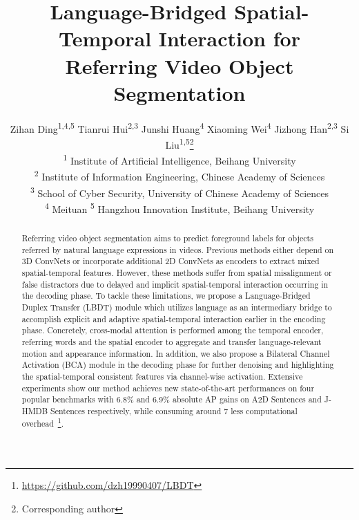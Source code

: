 \documentclass[10pt,twocolumn,letterpaper]{article}
\begin{document}
\title{Language-Bridged Spatial-Temporal Interaction for \\Referring Video Object Segmentation}

\author{Zihan Ding\textsuperscript{\rm 1,4,5} \quad Tianrui Hui\textsuperscript{\rm 2,3} \quad Junshi Huang\textsuperscript{\rm 4} \quad Xiaoming Wei\textsuperscript{\rm 4} \quad Jizhong Han\textsuperscript{\rm 2,3} \quad Si Liu\textsuperscript{\rm 1,5}\thanks{Corresponding author} \\
\textsuperscript{\rm 1} Institute of Artificial Intelligence, Beihang University\\
\textsuperscript{\rm 2} Institute of Information Engineering, Chinese Academy of Sciences\\
\textsuperscript{\rm 3} School of Cyber Security, University of Chinese Academy of Sciences\\
\textsuperscript{\rm 4} Meituan \quad \textsuperscript{\rm 5} Hangzhou Innovation Institute, Beihang University\\
}

\maketitle

\begin{abstract}

Referring video object segmentation aims to predict foreground labels for objects referred by natural language expressions in videos.
Previous methods either depend on 3D ConvNets or incorporate additional 2D ConvNets as encoders to extract mixed spatial-temporal features.
However, these methods suffer from spatial misalignment or false distractors due to delayed and implicit spatial-temporal interaction occurring in the decoding phase.
To tackle these limitations, we propose a Language-Bridged Duplex Transfer (LBDT) module which utilizes language as an intermediary bridge to accomplish explicit and adaptive spatial-temporal interaction earlier in the encoding phase.
Concretely, cross-modal attention is performed among the temporal encoder, referring words and the spatial encoder to aggregate and transfer language-relevant motion and appearance information.
In addition, we also propose a Bilateral Channel Activation (BCA) module in the decoding phase for further denoising and highlighting the spatial-temporal consistent features via channel-wise activation.
Extensive experiments show our method achieves new state-of-the-art performances on four popular benchmarks with 6.8\% and 6.9\% absolute AP gains on A2D Sentences and J-HMDB Sentences respectively, while consuming around 7 less computational overhead~\footnote{\url{https://github.com/dzh19990407/LBDT}}. 

\end{abstract}
\end{document}
